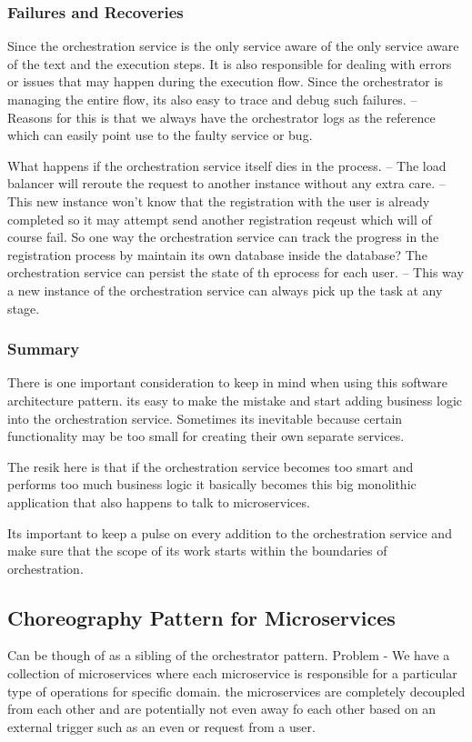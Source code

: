\documentclass[a4paper, 11pt]{book}
\begin{document}
    \subsubsection{Failures and Recoveries}
    Since the orchestration service is the only service aware of the only service aware of the text and the execution steps.
    It is also responsible for dealing with errors or issues that may happen during the execution flow.
    Since the orchestrator is managing the entire flow, its also easy to trace and debug such failures.
    -- Reasons for this is that we always have the orchestrator logs as the reference which can easily point use to the faulty service or bug.

    What happens if the orchestration service itself dies in the process.
    -- The load balancer will reroute the request to another instance without any extra care.
    -- This new instance won't know that the registration with the user is already completed so it may attempt send another registration reqeust which will of course fail.
    So one way the orchestration service can track the progress in the registration process by maintain its own database inside the database?
    The orchestration service can persist the state of th eprocess for each user.
    -- This way a new instance of the orchestration service can always pick up the task at any stage.

    \subsubsection{Summary}
    There is one important consideration to keep in mind when using this software architecture pattern.
    its easy to make the mistake and start adding business logic into the orchestration service.
    Sometimes its inevitable because certain functionality may be too small for creating their own separate services.

    The resik here is that if the orchestration service becomes too smart and performs too much business logic it basically becomes this big monolithic application that also happens to talk to microservices.

    Its important to keep a pulse on every addition to the orchestration service and make sure that the scope of its work starts within the boundaries of orchestration.

    \subsection{Choreography Pattern for Microservices}
    Can be though of as a sibling of the orchestrator pattern.
    Problem - We have a collection of microservices where each microservice is responsible for a particular type of operations for specific domain.
    the microservices are completely decoupled from each other and are potentially not even away fo each other based on an external trigger such as an even or request from a user.
\end{document}
